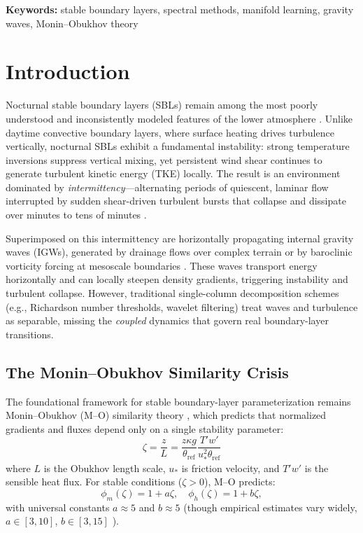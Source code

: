 \documentclass[11pt,a4paper]{article}
\begin{document}
\noindent \textbf{Keywords:} stable boundary layers, spectral methods, manifold learning, gravity waves, Monin--Obukhov theory

\newpage
\tableofcontents
\newpage

\section{Introduction}
\label{sec:intro}

Nocturnal stable boundary layers (SBLs) remain among the most poorly understood and inconsistently modeled features of the lower atmosphere \citep{Mahrt2014, Acevedo2016}. Unlike daytime convective boundary layers, where surface heating drives turbulence vertically, nocturnal SBLs exhibit a fundamental instability: strong temperature inversions suppress vertical mixing, yet persistent wind shear continues to generate turbulent kinetic energy (TKE) locally. The result is an environment dominated by \emph{intermittency}---alternating periods of quiescent, laminar flow interrupted by sudden shear-driven turbulent bursts that collapse and dissipate over minutes to tens of minutes \citep{Mahrt1999, Terradellas2001}.

Superimposed on this intermittency are horizontally propagating internal gravity waves (IGWs), generated by drainage flows over complex terrain or by baroclinic vorticity forcing at mesoscale boundaries \citep{Sun2015, Vosper2006}. These waves transport energy horizontally and can locally steepen density gradients, triggering instability and turbulent collapse. However, traditional single-column decomposition schemes (e.g., Richardson number thresholds, wavelet filtering) treat waves and turbulence as separable, missing the \emph{coupled} dynamics that govern real boundary-layer transitions.

\subsection{The Monin--Obukhov Similarity Crisis}

The foundational framework for stable boundary-layer parameterization remains Monin--Obukhov (M--O) similarity theory \citep{Obukhov1946, Paulson1970}, which predicts that normalized gradients and fluxes depend only on a single stability parameter:
\begin{equation}
\zeta = \frac{z}{L} = \frac{z \kappa g}{\theta_{\mathrm{ref}}} \frac{T'w'}{u_*^2 \theta_{\mathrm{ref}}}
\label{eq:zeta}
\end{equation}
where $L$ is the Obukhov length scale, $u_*$ is friction velocity, and $T'w'$ is the sensible heat flux. For stable conditions ($\zeta > 0$), M--O predicts:
\begin{equation}
\phi_m(\zeta) = 1 + a\zeta, \quad \phi_h(\zeta) = 1 + b\zeta,
\end{equation}
with universal constants $a \approx 5$ and $b \approx 5$ (though empirical estimates vary widely, $a \in [3, 10]$, $b \in [3, 15]$ \citep{Dyer1974, Högström1988}).
\end{document}
